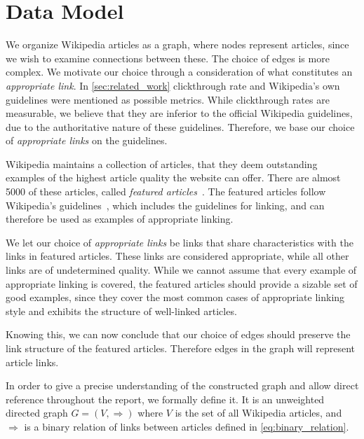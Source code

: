 \section{Data Model}\label{sec:choice_of_graph}
We organize Wikipedia articles as a graph, where nodes represent articles, since we wish to examine connections between these. The choice of edges is more complex. We motivate our choice through a consideration of what constitutes an \emph{appropriate link}. In \cref{sec:related_work} clickthrough rate and Wikipedia's own guidelines were mentioned as possible metrics. While clickthrough rates are measurable, we believe that they are inferior to the official Wikipedia guidelines, due to the authoritative nature of these guidelines. Therefore, we base our choice of \emph{appropriate links} on the guidelines.

Wikipedia maintains a collection of articles, that they deem outstanding examples of the highest article quality the website can offer. There are almost 5000 of these articles, called \emph{featured articles}~\cite{wiki-featured-articles}. The featured articles follow Wikipedia's guidelines~\cite{wiki-editor-guidelines}, which includes the guidelines for linking, and can therefore be used as examples of appropriate linking.%

We let our choice of \emph{appropriate links} be links that share characteristics with the links in featured articles. These links are considered appropriate, while all other links are of undetermined quality. 
While we cannot assume that every example of appropriate linking is covered, the featured articles should provide a sizable set of good examples, since they cover the most common cases of appropriate linking style and exhibits the structure of well-linked articles.


Knowing this, we can now conclude that our choice of edges should preserve the link structure of the featured articles. Therefore edges in the graph will represent article links.

In order to give a precise understanding of the constructed graph and allow direct reference throughout the report, we formally define it. It is an unweighted directed graph $G = (V,\Rightarrow)$ where $V$ is the set of all Wikipedia articles, and $\Rightarrow$ is a binary relation of links between articles defined in \cref{eq:binary_relation}.

